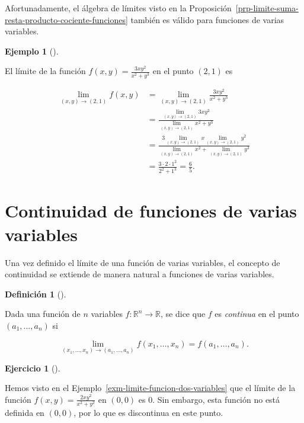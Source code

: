 \documentclass[
  a4paper,
]{scrreport}
\theoremstyle{plain}
\theoremstyle{plain}
\theoremstyle{definition}
\newtheorem{definition}{Definición}[chapter]
\theoremstyle{definition}
\newtheorem{example}{Ejemplo}[chapter]
\theoremstyle{plain}
\theoremstyle{definition}
\newtheorem{exercise}{Ejercicio}[chapter]
\theoremstyle{remark}
\begin{document}
Afortunadamente, el álgebra de límites visto en la
Proposición~\ref{prp-limite-suma-resta-producto-cociente-funciones}
también es válido para funciones de varias variables.

\begin{example}[]\protect\hypertarget{exm-algebra-limites-funciones-varias-variables}{}\label{exm-algebra-limites-funciones-varias-variables}

El límite de la función \(f(x,y)=\frac{3xy^2}{x^2+y^3}\) en el punto
\((2,1)\) es

\begin{align*}
\lim_{(x,y)\to(2,1)} f(x,y) 
&= \lim_{(x,y)\to(2,1)} \frac{3xy^2}{x^2+y^3} \\
&= \frac{\lim_{(x,y)\to(2,1)} 3xy^2}{\lim_{(x,y)\to(2,1)} x^2+y^3} \\
&= \frac{3\lim_{(x,y)\to(2,1)} x\lim_{(x,y)\to(2,1)}y^2}{\lim_{(x,y)\to(2,1)} x^2+\lim_{(x,y)\to(2,1)}y^3} \\
&= \frac{3\cdot 2\cdot 1^2}{2^2 + 1^3} 
= \frac{6}{5}.
\end{align*}

\end{example}

\hypertarget{continuidad-de-funciones-de-varias-variables}{%
\section{Continuidad de funciones de varias
variables}\label{continuidad-de-funciones-de-varias-variables}}

Una vez definido el límite de una función de varias variables, el
concepto de continuidad se extiende de manera natural a funciones de
varias variables.

\begin{definition}[]\protect\hypertarget{def-funcion-varias-variables-continua}{}\label{def-funcion-varias-variables-continua}

Dada una función de \(n\) variables
\(f:\mathbb{R}^n\rightarrow \mathbb{R}\), se dice que \(f\) es
\emph{continua} en el punto \((a_1, \ldots, a_n)\) si

\[
\lim_{(x_1,\ldots,x_n)\rightarrow (a_1,\ldots,a_n)}f(x_1,\ldots,x_n) = f(a_1,\ldots, a_n).
\]

\end{definition}

\begin{exercise}[]\protect\hypertarget{exr-funcion-varias-variables-discontinua}{}\label{exr-funcion-varias-variables-discontinua}

Hemos visto en el Ejemplo~\ref{exm-limite-funcion-dos-variables} que el
límite de la función \(f(x,y)=\frac{2xy^2}{x^2+y^2}\) en \((0,0)\) es
\(0\). Sin embargo, esta función no está definida en \((0,0)\), por lo
que es discontinua en este punto.

\end{exercise}
\end{document}
